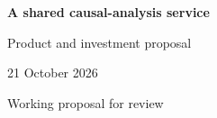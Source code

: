 \documentclass[11pt,a4paper]{article}
\begin{document}
\begin{center}{\LARGE\bfseries A shared causal-analysis service\par}\vspace{3mm}
{\large Product and investment proposal\par}\vspace{2mm}
21 October 2026\par Working proposal for review
\end{center}

\clearpage


\end{document}
